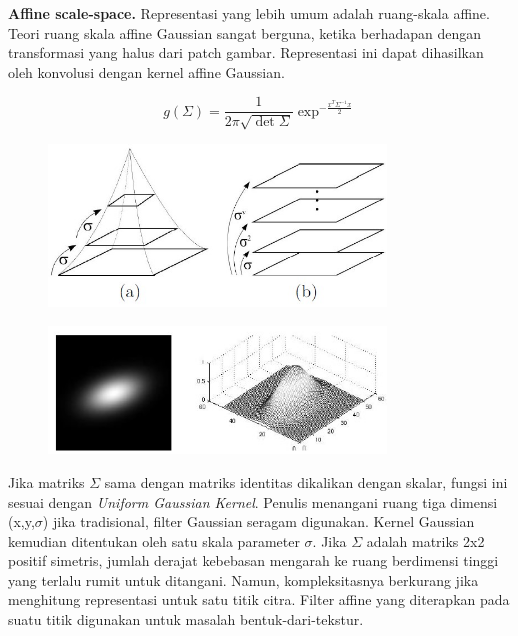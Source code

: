 \textbf{Aﬃne scale-space.} Representasi yang lebih umum adalah ruang-skala affine. 
Teori ruang skala affine Gaussian sangat berguna, ketika berhadapan dengan transformasi 
yang halus dari patch gambar. Representasi ini dapat dihasilkan oleh konvolusi dengan kernel affine Gaussian. 

\begin{equation}
  g(\Sigma) = \frac{1}{2\pi\sqrt{\det\Sigma}}\exp^{-\frac{x^{T}\Sigma^{-1}x}{2}}
\end{equation}

\begin{figure}
  \centering{}
  \includegraphics[width=0.8\textwidth]{gambar/Scale space.jpg}
  \caption{}
\end{figure}

\begin{figure}
  \centering{}
  \includegraphics[width=0.8\textwidth]{gambar/Affine Gaussian kernel.jpg}
  \caption{}
\end{figure}

Jika matriks \(\Sigma\) sama dengan matriks identitas dikalikan dengan skalar, fungsi ini sesuai dengan 
\emph{Uniform Gaussian Kernel}. Penulis menangani ruang tiga dimensi (x,y,\(\sigma\)) 
jika tradisional, filter Gaussian seragam digunakan. Kernel Gaussian kemudian ditentukan 
oleh satu skala parameter \(\sigma\). Jika \(\Sigma\) adalah matriks 2x2 positif simetris, 
jumlah derajat kebebasan mengarah ke ruang berdimensi tinggi yang terlalu rumit untuk ditangani. 
Namun, kompleksitasnya berkurang jika menghitung representasi untuk satu titik citra. 
Filter affine yang diterapkan pada suatu titik digunakan untuk masalah bentuk-dari-tekstur. 

